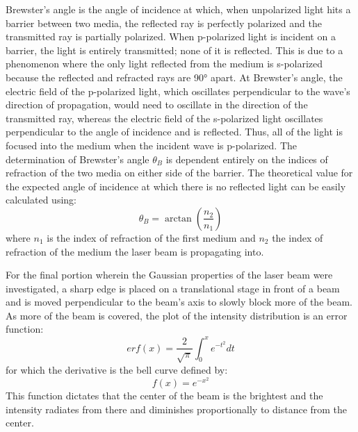 \documentclass[12pt,a4paper]{article}
\begin{document}
Brewster's angle is the angle of incidence at which, when unpolarized light hits a barrier between two media, the reflected ray is perfectly polarized and the transmitted ray is partially polarized. When p-polarized light is incident on a barrier, the light is entirely transmitted; none of it is reflected. This is due to a phenomenon where the only light reflected from the medium is s-polarized because the reflected and refracted rays are 90° apart. At Brewster's angle, the electric field of the p-polarized light, which oscillates perpendicular to the wave's direction of propagation, would need to oscillate in the direction of the transmitted ray, whereas the electric field of the s-polarized light oscillates perpendicular to the angle of incidence and is reflected. Thus, all of the light is focused into the medium when the incident wave is p-polarized. The determination of Brewster's angle $\theta_B$ is dependent entirely on the indices of refraction of the two media on either side of the barrier. The theoretical value for the expected angle of incidence at which there is no reflected light can be easily calculated using:
\begin{equation}
\theta_{B} = \arctan\left(\frac{n_{2}}{n_{1}}\right)
\end{equation}
where $n_1$ is the index of refraction of the first medium and $n_2$ the index of refraction of the medium the laser beam is propagating into.

For the final portion wherein the Gaussian properties of the laser beam were investigated, a sharp edge is placed on a translational stage in front of a beam and is moved perpendicular to the beam's axis to slowly block more of the beam. As more of the beam is covered, the plot of the intensity distribution is an error function:
\begin{equation}
erf(x) = \frac{2}{\sqrt{\pi}}\int_0^x e^{-t^2} dt
\end{equation}
for which the derivative is the bell curve defined by:
\begin{equation}
f(x) = e^{-x^2}
\end{equation}
This function dictates that the center of the beam is the brightest and the intensity radiates from there and diminishes proportionally to distance from the center.

\end{document}
